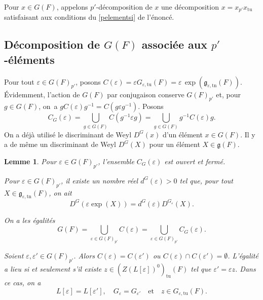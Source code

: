 \documentclass[JEP,XML,SOM,Unicode,francais]{cedram}
\let\oldenumerate\enumerate
\renewcommand{\enumerate}{\oldenumerate\itemindent0pt}
\newenvironment{enumeratei}
{\bgroup\def\theenumi{\roman{enumi}}\def\theenumii{\arabic{enumii}}\oldenumerate}
{\endenumerate\egroup}
\let\epsilon\varepsilon
\newcommand{\quadet}{\quad\text{et}\quad}
\newcommand{\frg}{\mathfrak{g}}
\newcommand{\tn}{\mathrm{tn}}
\newcommand{\tu}{\mathrm{tu}}
\theoremstyle{plain}
\newtheorem*{lem*}{Lemme}
\theoremstyle{definition}
\begin{document}
Pour $x\in G(F)$, appelons $p'$-décomposition de $x$ une décomposition $x=x_{p'}x_{\tu}$ satisfaisant aux conditions du \eqref{pelementsi} de l'énoncé.

\subsection{Décomposition de \texorpdfstring{$G(F)$}{GF} associée aux \texorpdfstring{$p'$}{p'}-éléments}\label{p'decomposition}

Pour tout $\epsilon\in G(F)_{p'}$, posons $C(\epsilon)=\epsilon G_{\epsilon,\tu}(F)=\epsilon\,\exp(\frg_{\epsilon,\tn}(F))$. Évidemment, l'action de $G(F)$ par conjugaison conserve $G(F)_{p'}$ et, pour $g\in G(F)$, on~a $gC(\epsilon)g^{-1}=C(g\epsilon g^{-1})$. Posons
\[
C_{G}(\epsilon)=\bigcup_{g\in G(F)}C(g^{-1}\epsilon g)=\bigcup_{g\in G(F)}g^{-1}C(\epsilon )g.
\]
On a déjà utilisé le discriminant de Weyl $D^G(x)$ d'un élément $x\in G(F)$. Il y a de même un discriminant de Weyl $D^G(X)$ pour un élément $X\in \frg(F)$.

\skpt
\begin{lem*}
\begin{enumeratei}
\item\label{p'decompositioni}
Pour $\epsilon\in G(F)_{p'}$, l'ensemble $C_{G}(\epsilon) $ est ouvert et fermé.

\item\label{p'decompositionii}
Pour $\epsilon\in G(F)_{p'}$, il existe un nombre réel $d^G(\epsilon)>0$ tel que, pour tout $X\in \frg_{\epsilon,\tn}(F)$, on ait
\[
D^G(\epsilon \exp(X))=d^G(\epsilon)D^{G_{\epsilon}}(X).
\]

\item\label{p'decompositioniii}
On a les égalités
\[
G(F)=\bigcup_{\epsilon\in G(F)_{p'}}C(\epsilon)=\bigcup_{\epsilon\in G(F)_{p'}}C_{G}(\epsilon).
\]

\item\label{p'decompositioniv}
Soient $\epsilon ,\epsilon '\in G(F)_{p'}$. Alors $C(\epsilon )=C(\epsilon ')$ ou $C(\epsilon )\cap C(\epsilon ')=\emptyset$. L'égalité a lieu si et seulement s'il existe $z\in (Z(L[\epsilon ])^0)_{\tu}(F)$ tel que $\epsilon '=\epsilon z$. Dans ce cas, on a
\[
L[\epsilon ]=L[\epsilon '],\quad G_{\epsilon}=G_{\epsilon'}\quadet z\in G_{\epsilon,\tu}(F).
\]
\end{enumeratei}
\end{lem*}
\end{document}
